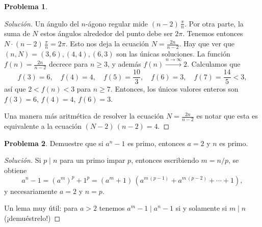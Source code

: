 \documentclass{article}
\theoremstyle{definition}
\newtheorem{problema}{Problema}
\newenvironment{solucion}{\begin{proof}[Solución]}{\end{proof}}
\begin{document}
\begin{problema}
  \ifdefined\solutions\begin{solucion}

    Un ángulo del $n$-ágono regular mide $(n-2)\,\frac{\pi}{n}$. Por otra parte,
    la suma de $N$ estos ángulos alrededor del punto debe ser $2\pi$. Tenemos
    entonces $N\cdot (n-2)\,\frac{\pi}{n} = 2\pi$. Esto nos deja la ecuación
    $N = \frac{2n}{n-2}$. Hay que ver que $(n,N) = (3,6), (4,4), (6,3)$ son las
    únicas soluciones. La función $f (n) = \frac{2n}{n-2}$ decrece para
    $n \ge 3$, y además $f (n) \xrightarrow{n\to \infty} 2$. Calculamos que
    $$f (3) = 6, \quad f (4) = 4, \quad f (5) = \frac{10}{3}, \quad f (6) = 3, \quad f (7) = \frac{14}{5} < 3,$$
    así que $2 < f (n) < 3$ para $n \ge 7$. Entonces, los únicos valores enteros
    son $f (3) = 6$, $f (4) = 4$, $f (6) = 3$.

    Una manera más aritmética de resolver la ecuación 
    $N = \frac{2n}{n-2}$ es notar que esta es equivalente a
    la ecuación $(N-2)\,(n-2) = 4$.
  \end{solucion}\fi
 \end{problema}

 \begin{problema}
   Demuestre que si $a^n - 1$ es primo, entonces $a = 2$ y $n$ es primo.

   \ifdefined\solutions\begin{solucion}
     Si $p \mid n$ para un primo impar $p$, entonces escribiendo $m = n/p$,
     se obtiene
     $$a^n - 1 = (a^m)^p + 1^p = (a^m + 1)\,(a^{m\,(p-1)} + a^{m\,(p-2)} + \cdots + 1),$$
     y necesariamente $a = 2$ y $n = p$.

     Un lema muy útil: para $a > 2$ tenemos $a^m - 1 \mid a^n - 1$ si y
     solamente si $m \mid n$ (¡demuéstrelo!)
   \end{solucion}\fi
\end{problema}
\end{document}
